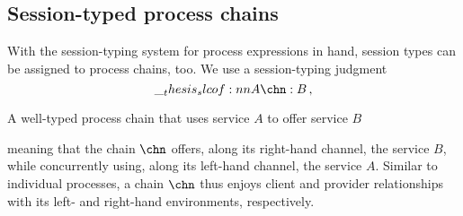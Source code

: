 


\subsection{Session-typed process chains}\label{sec:process-chains:typed-chains}

With the session-typing system for process expressions in hand, session types can be assigned to process chains, too.
We use a session-typing judgment
\begin{equation*}
  \slcof{A |- \chn : B} \,,
\end{equation*}
%
\begin{marginfigure}[-4\baselineskip]
  \centering
  \caption{A well-typed process chain that uses service $A$ to offer service $B$}\label{fig:singleton-processes:well-typed-chain}
\end{marginfigure}%
%
meaning that the chain $\chn$ offers, along its right-hand channel, the service $B$, while concurrently using, along its left-hand channel, the service $A$.
Similar to individual processes, a chain $\chn$ thus enjoys client and provider relationships with its left- and right-hand environments, respectively.


